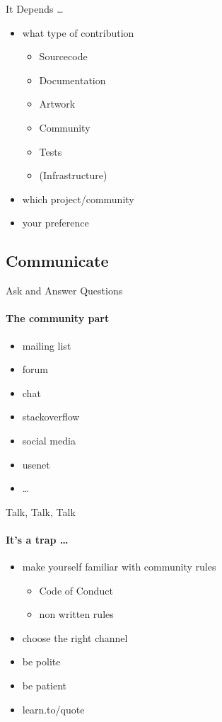 \documentclass{beamer}
\begin{document}
\begin{frame}{It Depends \dots}
    \begin{itemize}
        \item what type of contribution
            \begin{itemize}
                \item Sourcecode
                \item Documentation
                \item Artwork
                \item Community
                \item Tests
                \item (Infrastructure)
            \end{itemize}
        \item which project/community
        \item your preference
    \end{itemize}
\end{frame}

\subsection{Communicate}

\begin{frame}{Ask and Answer Questions}
    \framesubtitle{The community part}
    \begin{itemize}
        \item mailing list
        \item forum
        \item chat
        \item stackoverflow
        \item social media
        \item usenet
        \item \dots
    \end{itemize}
\end{frame}

\begin{frame}{Talk, Talk, Talk}
    \framesubtitle{It's a trap \dots}
    \begin{itemize}
        \item make yourself familiar with community rules
            \begin{itemize}
                \item Code of Conduct
                \item non written rules
            \end{itemize}
        \item choose the right channel
        \item be polite
        \item be patient
        \item learn.to/quote
    \end{itemize}
\end{frame}
\end{document}
